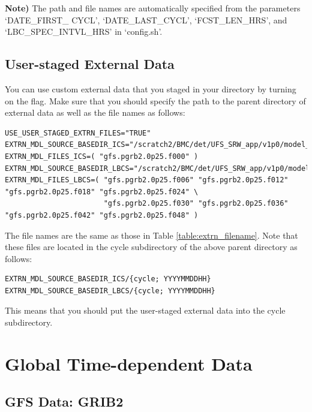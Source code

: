 \documentclass[11pt,fleqn]{report}              %
\begin{document}
{\bf Note)} The path and file names are automatically specified from the parameters `DATE\_FIRST\_ CYCL', `DATE\_LAST\_CYCL', `FCST\_LEN\_HRS', and `LBC\_SPEC\_INTVL\_HRS' in `config.sh'.


\subsection{User-staged External Data}
\label{subsec:extrn_mdl_custom}

You can use custom external data that you staged in your directory by turning on the flag. Make sure that you should specify the path to the parent directory of external data as well as the file names as follows:

\lstset{language=bash}   
\begin{lstlisting}[frame=trBL, basicstyle=\scriptsize]
USE_USER_STAGED_EXTRN_FILES="TRUE"
EXTRN_MDL_SOURCE_BASEDIR_ICS="/scratch2/BMC/det/UFS_SRW_app/v1p0/model_data/FV3GFS"
EXTRN_MDL_FILES_ICS=( "gfs.pgrb2.0p25.f000" )
EXTRN_MDL_SOURCE_BASEDIR_LBCS="/scratch2/BMC/det/UFS_SRW_app/v1p0/model_data/FV3GFS"
EXTRN_MDL_FILES_LBCS=( "gfs.pgrb2.0p25.f006" "gfs.pgrb2.0p25.f012" "gfs.pgrb2.0p25.f018" "gfs.pgrb2.0p25.f024" \
                       "gfs.pgrb2.0p25.f030" "gfs.pgrb2.0p25.f036" "gfs.pgrb2.0p25.f042" "gfs.pgrb2.0p25.f048" )
\end{lstlisting}

The file names are the same as those in Table \ref{table:extrn_filename}. Note that these files are located in the cycle subdirectory of the above parent directory as follows:
\lstset{language=bash}   
\begin{lstlisting}[frame=trBL]
EXTRN_MDL_SOURCE_BASEDIR_ICS/{cycle; YYYYMMDDHH}
EXTRN_MDL_SOURCE_BASEDIR_LBCS/{cycle; YYYYMMDDHH}
\end{lstlisting}
This means that you should put the user-staged external data into the cycle subdirectory.



\section{Global Time-dependent Data}
\label{sec:glb2reg_glbinput}

\subsection{GFS Data: GRIB2}
\label{subsec:sar_data_grib2}
\end{document}
